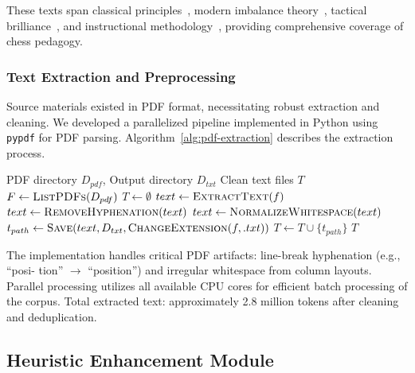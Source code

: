\documentclass[sigconf,nonacm]{acmart}
\begin{document}
These texts span classical principles~\cite{tarrasch1935game}, modern imbalance theory~\cite{silman2010reassess}, tactical brilliance~\cite{tal1997life}, and instructional methodology~\cite{chernev1957logical}, providing comprehensive coverage of chess pedagogy.

\subsubsection{Text Extraction and Preprocessing}

Source materials existed in PDF format, necessitating robust extraction and cleaning. We developed a parallelized pipeline implemented in Python using \texttt{pypdf} for PDF parsing. Algorithm~\ref{alg:pdf-extraction} describes the extraction process.

\begin{algorithm}[htbp]
\caption{PDF Text Extraction Pipeline}
\label{alg:pdf-extraction}
\begin{algorithmic}[1]
\Require PDF directory $D_{pdf}$, Output directory $D_{txt}$
\Ensure Clean text files $T$
\State $F \gets \textsc{ListPDFs}(D_{pdf})$ 
\State $T \gets \emptyset$
    \State $text \gets \textsc{ExtractText}(f)$ 
    \State $text \gets \textsc{RemoveHyphenation}(text)$ 
    \State $text \gets \textsc{NormalizeWhitespace}(text)$ 
     
        \State $t_{path} \gets \textsc{Save}(text, D_{txt}, \textsc{ChangeExtension}(f, .txt))$
        \State $T \gets T \cup \{t_{path}\}$
    \EndIf
\EndFor
\State \Return $T$
\end{algorithmic}
\end{algorithm}

The implementation handles critical PDF artifacts: line-break hyphenation (e.g., ``posi- tion'' $\rightarrow$ ``position'') and irregular whitespace from column layouts. Parallel processing utilizes all available CPU cores for efficient batch processing of the corpus. Total extracted text: approximately 2.8 million tokens after cleaning and deduplication.

\subsection{Heuristic Enhancement Module}
\label{subsec:heuristic}
\end{document}
